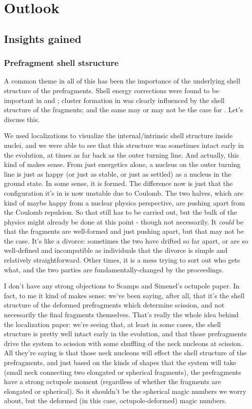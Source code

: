 \chapter{Outlook}\label{chap:Outlook}

\section{Insights gained}
\subsection{Prefragment shell stsructure}
A common theme in all of this has been the importance of the underlying shell structure of the prefragments. Shell energy corrections were found to be important in {\Pt} and {\Hg}; cluster formation in {\Og} was clearly influenced by the shell structure of the fragments; and the same may or may not be the case for {\Cf}. Let's discuss this.

We used localizations to visualize the internal/intrinsic shell structure inside nuclei, and we were able to see that this structure was sometimes intact early in the evolution, at times as far back as the outer turning line. And actually, this kind of makes sense. From just energetics alone, a nucleus on the outer turning line is just as happy (or just as stable, or just as settled) as a nucleus in the ground state. In some sense, it is formed. The difference now is just that the configuration it's in is now unstable due to Coulomb. The two halves, which are kind of maybe happy from a nuclear physics perspective, are pushing apart from the Coulomb repulsion. So that still has to be carried out, but the bulk of the physics might already be done at this point - though not necessarily. It \textit{could} be that the fragments are well-formed and just pushing apart, but that may not be the case. It's like a divorce: sometimes the two have drifted so far apart, or are so well-defined and incompatible as individuals that the divorce is simple and relatively straightforward. Other times, it is a mess trying to sort out who gets what, and the two parties are fundamentally-changed by the proceedings.

I don't have any strong objections to Scamps and Simenel's octupole paper. In fact, to me it kind of makes sense: we've been saying, after all, that it's the shell structure of the deformed prefragments which determine scission, and not necessarily the final fragments themselves. That's really the whole idea behind the localization paper: we're seeing that, at least in some cases, the shell structure is pretty well intact early in the evolution, and that those prefragments drive the system to scission with some shuffling of the neck nucleons at scission. All they're saying is that those neck nucleons will effect the shell structure of the prefragments, and just based on the kinds of shapes that the system will take (small neck connecting two elongated or spherical fragments), the prefragments have a strong octupole moment (regardless of whether the fragments are elongated or spherical). So it shouldn't be the spherical magic numbers we worry about, but the deformed (in this case, octupole-deformed) magic numbers.

